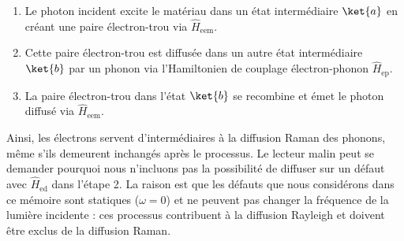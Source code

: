 \begin{enumerate}
    \item Le photon incident excite le matériau dans un état intermédiaire $\ket{a}$ en créant une paire électron-trou via $\hat{H}_\text{eem}$.
    \item Cette paire électron-trou est diffusée dans un autre état intermédiaire $\ket{b}$ par un phonon via l'Hamiltonien de couplage électron-phonon $\hat{H}_\text{ep}$.
    \item La paire électron-trou dans l'état $\ket{b}$ se recombine et émet le photon diffusé via $\hat{H}_\text{eem}$.
\end{enumerate}
Ainsi, les électrons servent d'intermédiaires à la diffusion Raman des phonons, même s'ils demeurent inchangés après le processus. Le lecteur malin peut se demander pourquoi nous n'incluons pas la possibilité de diffuser sur un défaut avec $\hat{H}_\text{ed}$ dans l'étape 2. La raison est que les défauts que nous considérons dans ce mémoire sont statiques ($\omega=0$) et ne peuvent pas changer la fréquence de la lumière incidente : ces processus contribuent à la diffusion Rayleigh et doivent être exclus de la diffusion Raman.

